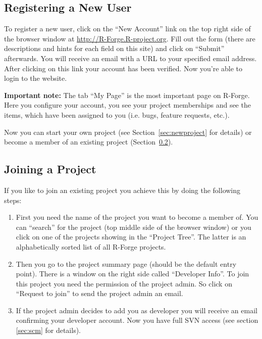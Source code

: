 \documentclass[a4paper]{article}
\newcommand{\proglang}[1]{\textsf{#1}}
\begin{document}
\subsection{Registering a  New User}

To register a new user, click on the ``New Account'' link on the top
right side of the browser window at \url{http://R-Forge.R-project.org}.
Fill out the form (there are descriptions and hints for each field on
this site) and click on ``Submit'' afterwards. You will receive an
email with
a URL to your specified email address. After clicking on this link
your account has been verified. Now you're able to login to the
website.
\newline

\textbf{Important note:} The tab ``My Page'' is the most important
page on \proglang{R}-Forge. Here you configure your account, you see your
project memberships and see the items, which have been assigned to you
(i.e. bugs, feature requests, etc.).
\newline

Now you can start your own project (see Section~\ref{sec:newproject}
for details) or become a member of an existing project
(Section~\ref{sec:joinproject}). 

\subsection{Joining a Project}
\label{sec:joinproject}
If you like to join an existing project you achieve this by doing the
following steps:
\begin{enumerate}
\item First you need the name of the project you want to become a
  member of. You can ``search'' for the project (top middle side of the
  browser window) or you click on one of the projects showing in the
  ``Project Tree''. The latter is an alphabetically sorted list of all
  \proglang{R}-Forge projects.
\item Then you go to the project summary page (should be the default
  entry point). There is a window on the right side called
  ``Developer Info''. To join this project you need the permission of
  the project admin. So click on ``Request to join'' to send the
  project admin an email.
\item If the project admin decides to add you as developer you will
  receive an email confirming your developer account. Now you have
  full SVN access (see section \ref{sec:scm} for details).
\end{enumerate}
\end{document}
